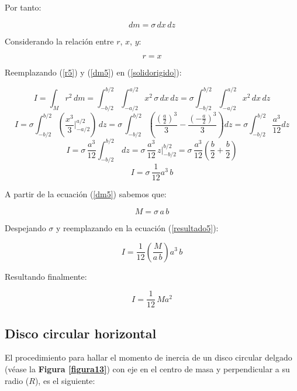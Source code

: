 \documentclass[letter,oneside,11pt]{article}
\begin{document}
Por tanto:

\begin{equation}
    dm = \sigma\, dx\, dz
\label{dm5}
\end{equation}

Considerando la relación entre $r$, $x$, $y$:

\begin{equation}
    r = x
\label{r5}
\end{equation}

Reemplazando (\ref{r5}) y (\ref{dm5}) en (\ref{solidorigido}):

\begin{equation*}
    I = \int_{M} r^2\, dm = \int_{-b/2}^{b/2} \int_{-a/2}^{a/2} x^2\, \sigma\, dx\, dz = \sigma \int_{-b/2}^{b/2} \int_{-a/2}^{a/2} x^2\, dx\, dz
\end{equation*}
\begin{equation*}
    I = \sigma \int_{-b/2}^{b/2} \left( \frac{x^3}{3} \Biggr|_{-a/2}^{a/2} \right) \, dz = \sigma\, \int_{-b/2}^{b/2} \left( \frac{(\frac{a}{2})^3}{3} - \frac{(-\frac{a}{2})^3}{3} \right) dz = \sigma \int_{-b/2}^{b/2} \frac{a^3}{12} dz
\end{equation*}
\begin{equation*}
    I = \sigma\, \frac{a^3}{12} \int_{-b/2}^{b/2}\, dz = \sigma\, \frac{a^3}{12}\, z \Biggr|_{-b/2}^{b/2} = \sigma\, \frac{a^3}{12} \left( \frac{b}{2} + \frac{b}{2} \right)
\end{equation*}
\begin{equation}
    I = \sigma\, \frac{1}{12} a^3\, b
\label{resultado5}
\end{equation}

A partir de la ecuación (\ref{dm5}) sabemos que:

\begin{equation*}
    M = \sigma\, a\, b
\end{equation*}

Despejando $\sigma$ y reemplazando en la ecuación (\ref{resultado5}):

\begin{equation*}
    I = \frac{1}{12} \left( \frac{M}{a\, b} \right) a^3\, b
\end{equation*}

Resultando finalmente:

\begin{equation}
    I = \frac{1}{12}\, M a^2
\end{equation}

\subsection{Disco circular horizontal}
El procedimiento para hallar el momento de inercia de un disco circular
delgado (véase la \textbf{Figura \ref{figura13}}) con eje en el centro de masa y
perpendicular a su radio ($R$), es el siguiente:
\end{document}
